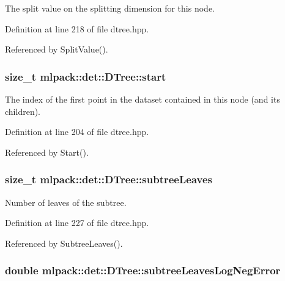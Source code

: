 The split value on the splitting dimension for this node. 



Definition at line 218 of file dtree.\-hpp.



Referenced by Split\-Value().

\subsubsection[{start}]{\setlength{\rightskip}{0pt plus 5cm}size\-\_\-t mlpack\-::det\-::\-D\-Tree\-::start\hspace{0.3cm}{\ttfamily [private]}}\label{classmlpack_1_1det_1_1DTree_ae0dd3d04c990f793fad0a5d77659659d}


The index of the first point in the dataset contained in this node (and its children). 



Definition at line 204 of file dtree.\-hpp.



Referenced by Start().

\subsubsection[{subtree\-Leaves}]{\setlength{\rightskip}{0pt plus 5cm}size\-\_\-t mlpack\-::det\-::\-D\-Tree\-::subtree\-Leaves\hspace{0.3cm}{\ttfamily [private]}}\label{classmlpack_1_1det_1_1DTree_a131701db985141db1352bb913af75fae}


Number of leaves of the subtree. 



Definition at line 227 of file dtree.\-hpp.



Referenced by Subtree\-Leaves().

\subsubsection[{subtree\-Leaves\-Log\-Neg\-Error}]{\setlength{\rightskip}{0pt plus 5cm}double mlpack\-::det\-::\-D\-Tree\-::subtree\-Leaves\-Log\-Neg\-Error\hspace{0.3cm}{\ttfamily [private]}}\label{classmlpack_1_1det_1_1DTree_a323f87f699b71c7a25f863ea416f8c56}


